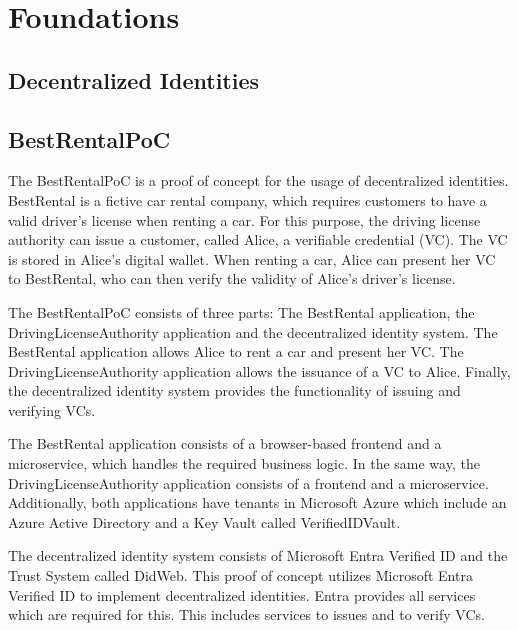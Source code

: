 \chapter{Foundations}
\label{cha:foundations}


\section{Decentralized Identities}


\section{BestRentalPoC}

The BestRentalPoC is a proof of concept for the usage of decentralized identities.
BestRental is a fictive car rental company, which requires customers to have a valid driver's license
when renting a car.
For this purpose, the driving license authority can issue a customer, called Alice, a verifiable credential (VC).
The VC is stored in Alice's digital wallet.
When renting a car, Alice can present her VC to BestRental, who can then verify the validity of Alice's driver's license.

The BestRentalPoC consists of three parts: The BestRental application, the DrivingLicenseAuthority application
and the decentralized identity system.
The BestRental application allows Alice to rent a car and present her VC.
The DrivingLicenseAuthority application allows the issuance of a VC to Alice.
Finally, the decentralized identity system provides the functionality of issuing and verifying VCs.

The BestRental application consists of a browser-based frontend and a microservice, which handles the required
business logic. In the same way, the DrivingLicenseAuthority application consists of a frontend and a microservice.
Additionally, both applications have tenants in Microsoft Azure which include an Azure Active Directory and
a Key Vault called VerifiedIDVault.

The decentralized identity system consists of Microsoft Entra Verified ID and the Trust System called DidWeb.
This proof of concept utilizes Microsoft Entra Verified ID to implement decentralized identities.
Entra provides all services which are required for this. This includes services to issues and to verify VCs.

